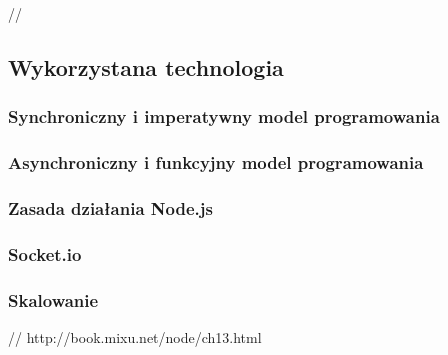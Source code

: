 // 

\subsection{Wykorzystana technologia}

\subsubsection{Synchroniczny i imperatywny model programowania}

\subsubsection{Asynchroniczny i funkcyjny model programowania}

\subsubsection{Zasada działania Node.js}

\subsubsection{Socket.io}

\subsubsection{Skalowanie}

// http://book.mixu.net/node/ch13.html
